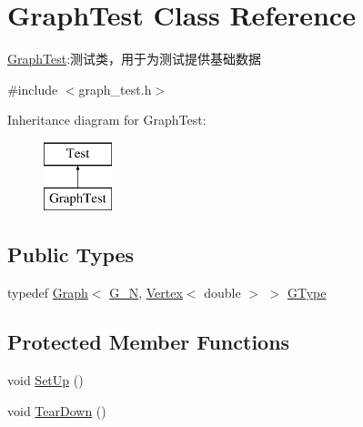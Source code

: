 \hypertarget{class_graph_test}{}\section{Graph\+Test Class Reference}
\label{class_graph_test}


\hyperlink{class_graph_test}{Graph\+Test}\+:测试类，用于为测试提供基础数据  




{\ttfamily \#include $<$graph\+\_\+test.\+h$>$}

Inheritance diagram for Graph\+Test\+:\begin{figure}[H]
\begin{center}
\leavevmode
\includegraphics[height=2.000000cm]{class_graph_test}
\end{center}
\end{figure}
\subsection*{Public Types}
\begin{DoxyCompactItemize}
\item 
typedef \hyperlink{struct_introduction_to_algorithm_1_1_graph_algorithm_1_1_graph}{Graph}$<$ \hyperlink{graph__test_8h_abad8d08eab108f595a7ea22132648528}{G\+\_\+\+N}, \hyperlink{struct_introduction_to_algorithm_1_1_graph_algorithm_1_1_vertex}{Vertex}$<$ double $>$ $>$ \hyperlink{class_graph_test_a35200ea3d08690769c40550cba2ecd5a}{G\+Type}
\end{DoxyCompactItemize}
\subsection*{Protected Member Functions}
\begin{DoxyCompactItemize}
\item 
void \hyperlink{class_graph_test_a2f0d213d11ea0b8245c526379674b91b}{Set\+Up} ()
\item 
void \hyperlink{class_graph_test_a53c606b64363a694f425a844dfabc08e}{Tear\+Down} ()
\end{DoxyCompactItemize}

